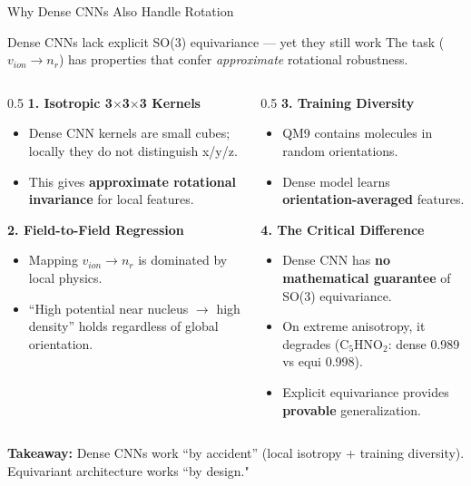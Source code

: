 \documentclass[aspectratio=169]{beamer}
\begin{document}
\begin{frame}{Why Dense CNNs Also Handle Rotation}
  \begin{block}{Dense CNNs lack explicit SO(3) equivariance — yet they still work}
    The task ($v_{ion} \rightarrow n_r$) has properties that confer \textit{approximate} rotational robustness.
  \end{block}

  \begin{columns}
    \begin{column}{0.5\textwidth}
      \textbf{1. Isotropic 3$\times$3$\times$3 Kernels}
      \begin{itemize}
        \item Dense CNN kernels are small cubes; locally they do not distinguish x/y/z.
        \item This gives \textbf{approximate rotational invariance} for local features.
      \end{itemize}

      \vspace{0.2cm}
      \textbf{2. Field-to-Field Regression}
      \begin{itemize}
        \item Mapping $v_{ion} \rightarrow n_r$ is dominated by local physics.
        \item ``High potential near nucleus $\rightarrow$ high density'' holds regardless of global orientation.
      \end{itemize}
    \end{column}
    \begin{column}{0.5\textwidth}
      \textbf{3. Training Diversity}
      \begin{itemize}
        \item QM9 contains molecules in random orientations.
        \item Dense model learns \textbf{orientation-averaged} features.
      \end{itemize}

      \vspace{0.2cm}
      \textbf{4. The Critical Difference}
      \begin{itemize}
        \item Dense CNN has \textbf{no mathematical guarantee} of SO(3) equivariance.
        \item On extreme anisotropy, it degrades (C$_5$HNO$_2$: dense 0.989 vs equi 0.998).
        \item Explicit equivariance provides \textbf{provable} generalization.
      \end{itemize}
    \end{column}
  \end{columns}

  \vspace{0.3cm}
  \centering
  \footnotesize
  \textbf{Takeaway:} Dense CNNs work ``by accident'' (local isotropy + training diversity). Equivariant architecture works ``by design."
\end{frame}
\end{document}
